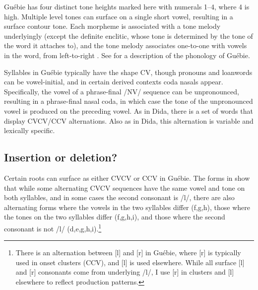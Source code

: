 \documentclass[output=paper,colorlinks,citecolor=brown]{langscibook}
\begin{document}
Guébie has four distinct tone heights marked here with numerals 1--4, where 4 is high. Multiple level tones can surface on a single short vowel, resulting in a surface contour tone. Each morpheme is associated with a tone melody underlyingly (except the definite enclitic, whose tone is determined by the tone of the word it attaches to), and the tone melody associates one-to-one with vowels in the word, from left-to-right \citep{Sande:diss}. See \citet{Sande:LLC} for a description of the phonology of Guébie.

Syllables in Guébie typically have the shape CV, though pronouns and loanwords can be vowel-initial, and in certain derived contexts coda nasals appear. Specifically, the vowel of a phrase-final /NV/ sequence can be unpronounced, resulting in a phrase-final nasal coda, in which case the tone of the unpronounced vowel is produced on the preceding vowel. As in Dida, there is a set of words that display CVCV\slash CCV alternations. Also as in Dida, this alternation is variable and lexically specific.

\subsection{Insertion or deletion?}
Certain roots can surface as either CVCV or CCV in Guébie. The forms in  show that while some alternating CVCV sequences have the same vowel and tone on both syllables, and in some cases the second consonant is /l/, there are also alternating forms where the vowels in the two syllables differ (f,g,h), those where the tones on the two syllables differ (f,g,h,i), and those where the second consonant is not /l/ (d,e,g,h,i).\footnote{There is an alternation between [l] and [r] in Guébie, where [r] is typically used in onset clusters (CCV), and [l] is used elsewhere. While all surface [l] and [r] consonants come from underlying /l/, I use [r] in clusters and [l] elsewhere to reflect production patterns.}
\end{document}
